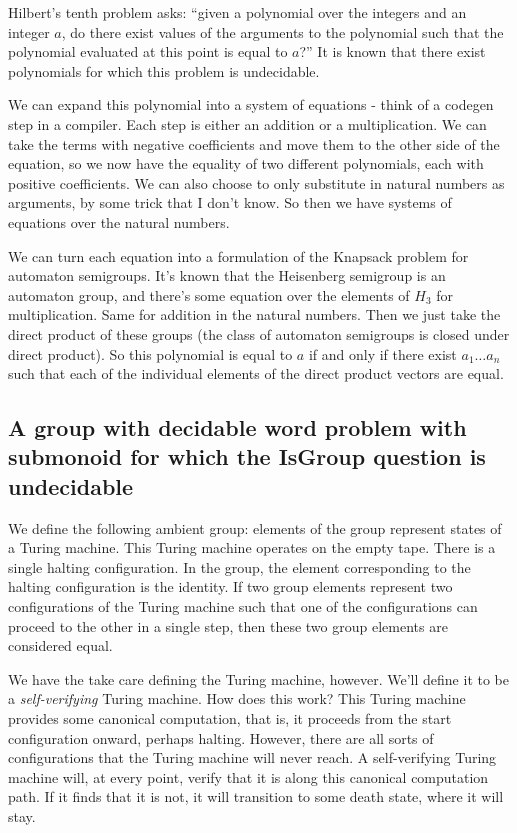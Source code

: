 \documentclass[10pt]{article}
\newcommand{\defn}[1]{\textit{#1}}
\begin{document}
Hilbert's tenth problem asks: ``given a polynomial over the integers
and an integer $a$, do there exist values of the arguments to the
polynomial such that the polynomial evaluated at this point is equal
to $a$?'' It is known that there exist polynomials for which this
problem is undecidable.

We can expand this polynomial into a system of equations - think of a
codegen step in a compiler. Each step is either an addition or a
multiplication. We can take the terms with negative coefficients and
move them to the other side of the equation, so we now have the
equality of two different polynomials, each with positive
coefficients. We can also choose to only substitute in natural numbers
as arguments, by some trick that I don't know. So then we have systems
of equations over the natural numbers.

We can turn each equation into a formulation of the Knapsack problem
for automaton semigroups. It's known that the Heisenberg semigroup is
an automaton group, and there's some equation over the elements of
$H_3$ for multiplication. Same for addition in the natural
numbers. Then we just take the direct product of these groups (the
class of automaton semigroups is closed under direct product). So this
polynomial is equal to $a$ if and only if there exist $a_1 \ldots a_n$
such that each of the individual elements of the direct product
vectors are equal.

\subsection{A group with decidable word problem with submonoid for
  which the IsGroup question is undecidable}

We define the following ambient group: elements of the group represent
states of a Turing machine. This Turing machine operates on the empty
tape. There is a single halting configuration. In the group, the
element corresponding to the halting configuration is the identity. If
two group elements represent two configurations of the Turing machine
such that one of the configurations can proceed to the other in a
single step, then these two group elements are considered equal.

We have the take care defining the Turing machine, however. We'll
define it to be a \defn{self-verifying} Turing machine. How does this
work? This Turing machine provides some canonical computation, that
is, it proceeds from the start configuration onward, perhaps
halting. However, there are all sorts of configurations that the
Turing machine will never reach. A self-verifying Turing machine will,
at every point, verify that it is along this canonical computation
path. If it finds that it is not, it will transition to some death
state, where it will stay.
\end{document}
